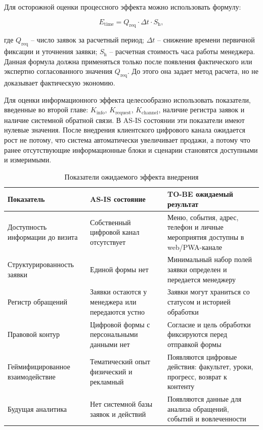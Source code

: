 Для осторожной оценки процессного эффекта можно использовать формулу:

\begin{equation}
E_{\text{time}} = Q_{\text{req}} \cdot \Delta t \cdot S_{\text{h}},
\label{eq:ch3_time_effect}
\end{equation}

где \(Q_{\text{req}}\) -- число заявок за расчетный период; \(\Delta t\) -- снижение времени первичной фиксации и уточнения заявки; \(S_{\text{h}}\) -- расчетная стоимость часа работы менеджера. Данная формула должна применяться только после появления фактического или экспертно согласованного значения \(Q_{\text{req}}\). До этого она задает метод расчета, но не доказывает фактическую экономию.

Для оценки информационного эффекта целесообразно использовать показатели, введенные во второй главе: \(K_{\text{info}}\), \(K_{\text{request}}\), \(K_{\text{channel}}\), наличие регистра заявок и наличие системной обратной связи. В AS-IS состоянии эти показатели имеют нулевые значения. После внедрения клиентского цифрового канала ожидается рост не потому, что система автоматически увеличивает продажи, а потому что ранее отсутствующие информационные блоки и сценарии становятся доступными и измеримыми.

\begin{table}[H]
\centering
\small
\caption{Показатели ожидаемого эффекта внедрения}
\label{tab:ch3_effect_metrics}
\begin{tabularx}{\textwidth}{|>{\raggedright\arraybackslash}p{}|>{\raggedright\arraybackslash}p{}|>{\raggedright\arraybackslash}X|}
\hline
\textbf{Показатель} & \textbf{AS-IS состояние} & \textbf{TO-BE ожидаемый результат} \\ \hline
Доступность информации до визита & Собственный цифровой канал отсутствует & Меню, события, адрес, телефон и личные мероприятия доступны в web/PWA-канале \\ \hline
Структурированность заявки & Единой формы нет & Минимальный набор полей заявки определен и передается менеджеру \\ \hline
Регистр обращений & Заявки остаются у менеджера или передаются устно & Заявки могут храниться со статусом и историей обработки \\ \hline
Правовой контур & Цифровой формы с персональными данными нет & Согласие и цель обработки фиксируются перед отправкой формы \\ \hline
Геймифицированное взаимодействие & Тематический опыт физический и рекламный & Появляются цифровые действия: факультет, уроки, прогресс, возврат к контенту \\ \hline
Будущая аналитика & Нет системной базы заявок и действий & Появляются данные для анализа обращений, событий и вовлеченности \\ \hline
\end{tabularx}
\normalsize
\end{table}

